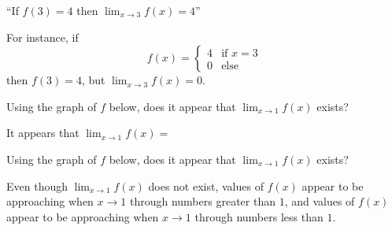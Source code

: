 \documentclass{ximera}
\begin{document}
\begin{question}
``If $f(3) = 4$ then $\displaystyle \lim_{x \to 3} f(x) = 4$''

\begin{multipleChoice}
\end{multipleChoice}

\begin{feedback}
  For instance, if
  \[
  f(x) =
  \begin{cases}
    4 &\text{if $x=3$} \\
    0 &\text{else}
  \end{cases}
  \]
  then $f(3)=4$, but $\lim_{x \to 3} f(x) =0$.
\end{feedback}
\end{question}

\begin{question}
Using the graph of $f$ below, does it appear that $\lim_{x \to 1} f(x)$ exists?  


\begin{multiple-choice}
\end{multiple-choice}


\begin{question}
	It appears that $\lim_{x\to 1} f(x) = $  
\end{question}


\end{question}



\begin{question}
Using the graph of $f$ below, does it appear that $\lim_{x \to 1} f(x)$ exists?  


\begin{multiple-choice}
\end{multiple-choice}


\begin{question}
	Even though $\lim_{x \to 1} f(x)$ does not exist, values of $f(x)$ appear to be approaching  when $x \to 1$ through numbers greater than $1$, and values of $f(x)$ appear to be approaching  when $x \to 1$ through numbers less than $1$.
\end{question}

\end{question}
\end{document}
